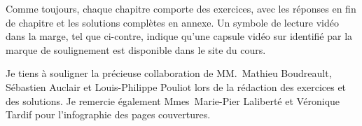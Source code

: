 Comme toujours, chaque chapitre comporte des exercices, avec les
réponses en fin de chapitre et les solutions complètes en annexe. Un
symbole de lecture vidéo dans la marge, tel que ci-contre, indique
qu'une capsule vidéo sur  identifié par la marque de
soulignement est disponible dans le site du cours.

Je tiens à souligner la précieuse collaboration de MM.~Mathieu
Boudreault, Sébastien Auclair et Louis-Philippe Pouliot lors de la
rédaction des exercices et des solutions. Je remercie également
Mmes~Marie-Pier Laliberté et Véronique Tardif pour l'infographie des
pages couvertures.

